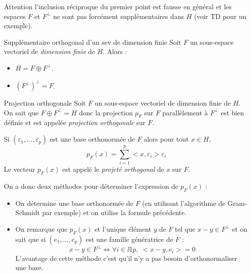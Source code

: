 \documentclass[french,11pt,twoside]{VcCours}
\begin{document}
\begin{Demonstration}{}

\vspace{6cm}
\end{Demonstration}

\begin{Remarque}{} Attention l'inclusion réciproque du premier point est fausse en général et les espaces $F$ et $F^{\perp}$ ne sont pas forcément supplémentaires dans $H$ (voir TD pour un exemple).
\end{Remarque}

\newpage

\begin{Theoreme}{Supplémentaire orthogonal d'un sev de dimension finie}
Soit $F$ un sous-espace vectoriel de \emph{dimension finie} de $H$. Alors :
\begin{itemize}
\item $H = F \oplus F^{\perp}$.
\item $(F^{\perp})^{\perp}=F$.
\end{itemize}
\end{Theoreme}

\begin{Demonstration}{}
\vspace{9cm}



\end{Demonstration}

\begin{Theoreme}{Projection orthogonale} Soit $F$ un sous-espace vectoriel de dimension finie de $H$. On sait que $F \oplus F^{\perp}=H$ donc la projection $p_F$ sur $F$ parallèlement à $F^{\perp}$ est bien définie et est appelée \emph{projection orthogonale} sur $F$.

Si $(\varepsilon_1, \ldots, \varepsilon_p)$ est une base orthonormée de $F$ alors pour tout $x \in H$,
$$ p_F(x) = \sum_{i=1}^p <x, \varepsilon_i> \varepsilon_i $$
Le vecteur $p_F(x)$ est appelé le \emph{projeté orthogonal} de $x$ sur $F$.
\end{Theoreme}


On a donc deux méthodes pour déterminer l'expression de $p_F(x)$ :
\begin{itemize}
\item On détermine une base orthonormée de $F$ (en utilisant l'algorithme de Gram-Schmidt par exemple) et on utilise la formule précédente.
\item On remarque que $p_F(x)$ et l'unique élément $y$ de $F$ tel que $x-y \in F^{\perp}$ et on sait que si $(e_1, \ldots, e_p)$ est une famille génératrice de $F$ :
$$ x-y \in F^{\perp} \Longleftrightarrow \forall i \in \ii{1}{p}, \; <x-y, e_i>=0 $$
L'avantage  de cette méthode c'est qu'il n'y a pas besoin d'orthonormaliser une base.
\end{itemize}
\end{document}

